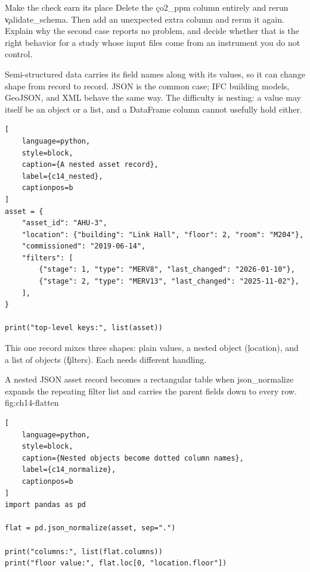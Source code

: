 \begin{TryBox}{Make the check earn its place}
Delete the \c{co2_ppm} column entirely and rerun \c{validate_schema}. Then add
an unexpected extra column and rerun it again. Explain why the second case
reports no problem, and decide whether that is the right behavior for a study
whose input files come from an instrument you do not control.
\end{TryBox}


Semi-structured data carries its field names along with its values, so it can
change shape from record to record. JSON is the common case; IFC building
models, GeoJSON, and XML behave the same way. The difficulty is nesting: a value
may itself be an object or a list, and a DataFrame column cannot usefully hold
either.

\begin{lstlisting}[
    language=python,
    style=block,
    caption={A nested asset record},
    label={c14_nested},
    captionpos=b
]
asset = {
    "asset_id": "AHU-3",
    "location": {"building": "Link Hall", "floor": 2, "room": "M204"},
    "commissioned": "2019-06-14",
    "filters": [
        {"stage": 1, "type": "MERV8", "last_changed": "2026-01-10"},
        {"stage": 2, "type": "MERV13", "last_changed": "2025-11-02"},
    ],
}

print("top-level keys:", list(asset))
\end{lstlisting}

This one record mixes three shapes: plain values, a nested object
(\c{location}), and a list of objects (\c{filters}). Each needs different
handling.

{A nested JSON asset record becomes a rectangular table when json\_normalize expands the repeating filter list and carries the parent fields down to every row.}
{fig:ch14-flatten}


\begin{lstlisting}[
    language=python,
    style=block,
    caption={Nested objects become dotted column names},
    label={c14_normalize},
    captionpos=b
]
import pandas as pd

flat = pd.json_normalize(asset, sep=".")

print("columns:", list(flat.columns))
print("floor value:", flat.loc[0, "location.floor"])
\end{lstlisting}

